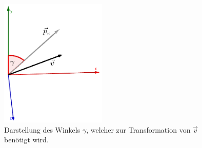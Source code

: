 \begin{figure}[h]
  \centering
  \includegraphics[width=0.45\textwidth]{../geogebra/img/winkel_v_edited}
  \caption{Darstellung des Winkels \(\gamma\), welcher zur Transformation von \(\vec{v}\) ben\"otigt wird.}
  \label{fig:winkelv}
\end{figure}

